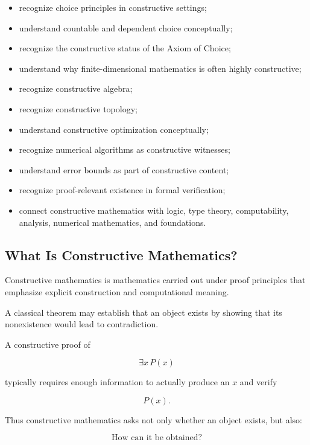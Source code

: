 {\begin{itemize}
    \item recognize choice principles in constructive settings;
    \item understand countable and dependent choice conceptually;
    \item recognize the constructive status of the Axiom of Choice;
    \item understand why finite-dimensional mathematics is often highly
          constructive;
    \item recognize constructive algebra;
    \item recognize constructive topology;
    \item understand constructive optimization conceptually;
    \item recognize numerical algorithms as constructive witnesses;
    \item understand error bounds as part of constructive content;
    \item recognize proof-relevant existence in formal verification;
    \item connect constructive mathematics with logic, type theory,
          computability, analysis, numerical mathematics, and foundations.
\end{itemize}
}

\subsection{What Is Constructive Mathematics?}
\label{subsec:what-is-constructive-mathematics}

Constructive mathematics is mathematics carried out under proof principles
that emphasize explicit construction and computational meaning.

A classical theorem may establish that an object exists by showing that its
nonexistence would lead to contradiction.

A constructive proof of

\[
\boxed{
\exists x\,P(x)
}
\]

typically requires enough information to actually produce an \(x\) and
verify

\[
\boxed{
P(x).
}
\]

Thus constructive mathematics asks not only whether an object exists, but
also:

\[
\boxed{
\text{How can it be obtained?}
}
\]

